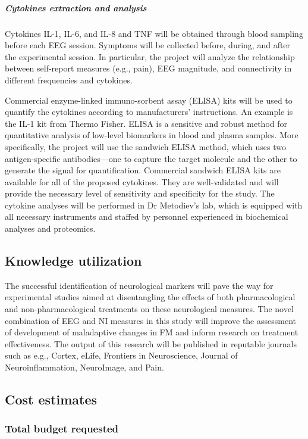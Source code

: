 \documentclass[twocolumn,  rga,issue, numeric]{jote-new-article}
\begin{document}
\renewcommand{\thefigure}{\arabic{figure}}
\subparagraph{Cytokines extraction and analysis}

Cytokines IL-1, IL-6, and IL-8 and TNF will be obtained through blood
sampling before each EEG session. Symptoms will be collected before,
during, and after the experimental session. In particular, the project
will analyze the relationship between self-report measures (e.g., pain),
EEG magnitude, and connectivity in different frequencies and cytokines.

Commercial enzyme-linked immuno-sorbent assay (ELISA) kits will be used
to quantify the cytokines according to manufacturers' instructions. An
example is the IL-1 kit from Thermo Fisher. ELISA is a sensitive and
robust method for quantitative analysis of low-level biomarkers in blood
and plasma samples. More specifically, the project will use the sandwich
ELISA method, which uses two antigen-specific antibodies—one to
capture the target molecule and the other to generate the signal for
quantification. Commercial sandwich ELISA kits are available for all of
the proposed cytokines. They are well-validated and will provide the
necessary level of sensitivity and specificity for the study. The
cytokine analyses will be performed in Dr Metodiev's lab, which is
equipped with all necessary instruments and staffed by personnel
experienced in biochemical analyses and proteomics.
\vfill{}

\subsection{Knowledge utilization}


The successful identification of neurological markers will pave the way
for experimental studies aimed at disentangling the effects of both
pharmacological and non-pharmacological treatments on these neurological
measures. The novel combination of EEG and NI measures in this study
will improve the assessment of development of maladaptive changes in FM
and inform research on treatment effectiveness. The output of this
research will be published in reputable journals such as e.g., Cortex,
eLife, Frontiers in Neuroscience, Journal of Neuroinflammation,
NeuroImage, and Pain.


\subsection{Cost estimates}



\subsubsection{Total budget requested}
\end{document}
